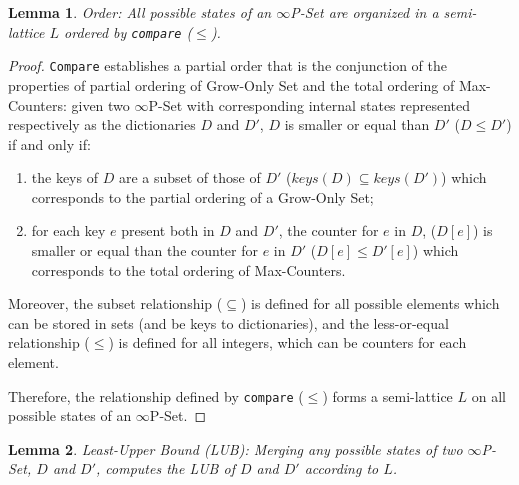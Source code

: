\documentclass[11pt, oneside]{article}   	%
\newtheorem{lemma}{Lemma}
\begin{document}
\begin{lemma}
Order: All possible states of an $\infty$P-Set are organized in a semi-lattice $L$ ordered by \texttt{compare} ($\leq$).
\end{lemma}
\begin{proof}
 \texttt{Compare} establishes a partial order that is the conjunction of the properties of partial ordering of Grow-Only Set and the total ordering of Max-Counters: given two $\infty$P-Set with corresponding internal states represented respectively as the dictionaries $D$ and $D'$, $D$ is smaller or equal than $D'$ ($D \leq D'$) if and only if: 
 \begin{enumerate}
     \item the keys of $D$ are a subset of those of $D'$ ($\textit{keys}(D) \subseteq \textit{keys}(D')$) which corresponds to the partial ordering of a Grow-Only Set; 
     \item for each key $e$ present both in $D$ and $D'$, the counter for $e$ in $D$, ($D[e]$) is smaller or equal than the counter for $e$ in $D'$ ($D[e] \leq D'[e]$) which corresponds to the total ordering of Max-Counters. 
 \end{enumerate}
 
Moreover, the subset relationship ($\subseteq$) is defined for all possible elements which can be stored in sets (and be keys to dictionaries), and the less-or-equal relationship ($\leq$) is defined for all integers, which can be counters for each element. 

Therefore, the relationship defined by \texttt{compare} ($\leq$) forms a semi-lattice $L$ on all possible states of an $\infty$P-Set.
\end{proof}

\begin{lemma}
Least-Upper Bound (LUB): Merging any possible states of two $\infty$P-Set, $D$ and $D'$,  computes the LUB of $D$ and $D'$ according to $L$.
\end{lemma}
\end{document}
